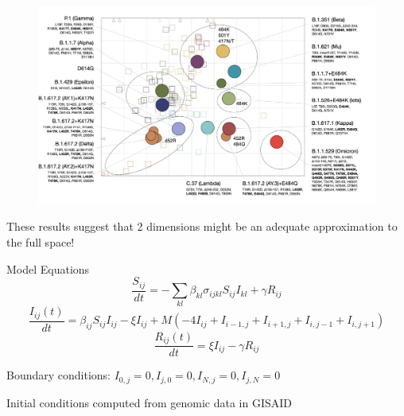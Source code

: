 \documentclass{beamer}
\begin{document}
\begin{frame}
        \begin{figure}
        \includegraphics[width=\textwidth]{wilks.png}
    \end{figure}   
    \centering
    \vfill
    \tiny{\cite{wilksMappingSARSCoV2Antigenic2022}}
\end{frame}

\begin{frame}
    These results suggest that 2 dimensions might be an adequate approximation to the full space!


\end{frame}


\begin{frame}{Model Equations}
    \small
    \begin{equation}
        \frac{S_{ij}}{dt} = -\sum_{kl} \beta_{kl} \sigma_{ijkl} S_{ij} I_{kl} + \gamma R_{ij}  \label{Seqn}
    \end{equation}
    \begin{equation}
        \frac{ I_{ij}(t)}{dt} = \beta_{ij} S_{ij} I_{ij} - \xi I_{ij} + M \left(- 4I_{ij} + I_{i-1,j}  + I_{i+1,j} + I_{i,j-1} + I_{i,j+1} \right) \label{Ieqn}    
    \end{equation}
    \begin{equation}
        \frac{R_{ij}(t)}{dt} = \xi I_{ij} - \gamma R_{ij}  \label{Reqn}
    \end{equation}

    Boundary conditions: $I_{0,j} = 0, I_{j,0} = 0,  I_{N,j} = 0, I_{j,N} = 0$

    Initial conditions computed from genomic data in GISAID 
\end{frame}
    
\end{document}
